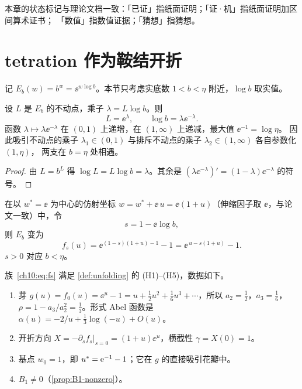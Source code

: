本章的状态标记与理论文档一致：「已证」指纸面证明；「证·机」指纸面证明加区间算术证书；
「数值」指数值证据；「猜想」指猜想。

\section{tetration 作为鞍结开折}\label{ch10:sec:unfolding}

记 $E_b(w)=b^w=\ee^{w\log b}$。本节只考虑实底数 $1<b<\eta$ 附近，$\log b$ 取实值。

\begin{lemma}[乘子参数化]\label{ch10:lem:param}
设 $L$ 是 $E_b$ 的不动点，乘子 $\lambda=L\log b$。则
\[
  L=\ee^{\lambda},\qquad \log b=\lambda\ee^{-\lambda}.
\]
函数 $\lambda\mapsto\lambda\ee^{-\lambda}$ 在 $(0,1)$ 上递增，在 $(1,\infty)$ 上递减，最大值 $\ee^{-1}=\log\eta$。
因此吸引不动点的乘子 $\lambda_1\in(0,1)$ 与排斥不动点的乘子 $\lambda_2\in(1,\infty)$ 各自参数化 $(1,\eta)$，
两支在 $b=\eta$ 处相遇。
\end{lemma}

\begin{proof}
由 $L=b^L$ 得 $\log L=L\log b=\lambda$。其余是 $(\lambda\ee^{-\lambda})'=(1-\lambda)\ee^{-\lambda}$ 的符号。
\end{proof}

在以 $w^*=\ee$ 为中心的仿射坐标 $w=w^*+\ee\,u=\ee(1+u)$（伸缩因子取 $\ee$，与论文一致）中，令
\begin{equation}\label{ch10:eq:s}
  s=1-\ee\log b ,
\end{equation}
则 $E_b$ 变为
\begin{equation}\label{ch10:eq:fs}
  f_s(u)=\ee^{(1-s)(1+u)-1}-1=\ee^{\,u-s(1+u)}-1 .
\end{equation}
$s>0$ 对应 $b<\eta$。

\begin{proposition}\label{ch10:prop:data}
族~\eqref{ch10:eq:fs} 满足 \cref{def:unfolding} 的 (H1)--(H5)，数据如下。
\begin{enumerate}
\item 芽 $g(u)=f_0(u)=\ee^u-1=u+\tfrac12u^2+\tfrac16u^3+\cdots$，所以 $a_2=\tfrac12$，$a_3=\tfrac16$，
  $\rho=1-a_3/a_2^2=\tfrac13$。形式 Abel 函数是 $\alpha(u)=-2/u+\tfrac13\log(-u)+O(u)$。
\item 开折方向 $X=-\partial_sf_s|_{s=0}=(1+u)\ee^u$，横截性 $\gamma=X(0)=1$。
\item 基点 $w_0=1$，即 $u^{*}=\mathrm{e}^{-1}-1$；它在 $g$ 的直接吸引花瓣中。
\item $B_1\neq0$（\cref{prop:B1-nonzero}）。
\end{enumerate}
\end{proposition}

